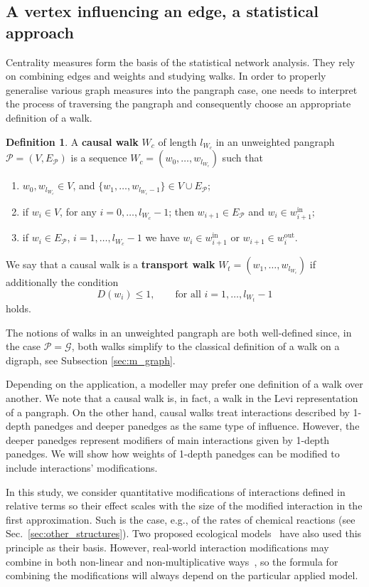 \documentclass[a4paper,12pt]{article}
\theoremstyle{definition}
\newtheorem{definition}{Definition}
\theoremstyle{remark}
\newcommand{\mG}{\mathcal{G}}
\newcommand{\mP}{\mathcal{P}}
\newcommand{\EP}{E_{\mathcal{P}}}
\newcommand{\tin}{\mathrm{in}}
\newcommand{\out}{\mathrm{out}}
\begin{document}
\subsection{A vertex influencing an edge, a statistical approach}\label{sec:v->e}
Centrality measures form the basis of the statistical network analysis. They rely on combining edges and weights and studying walks. In order to properly generalise various graph measures into the pangraph case, one needs to interpret the process of traversing the pangraph and consequently choose an appropriate definition of a walk. 

\begin{definition}\label{def:walk}
    A \textbf{causal walk} $W_c$ of length $l_{W_c}$ in an unweighted pangraph $\mP=(V,\EP)$ is a sequence $W_c=(w_{0},\ldots, w_{l_{W_c}})$ such that
    
\begin{enumerate}
    \item $w_{0},w_{l_{W_c}} \in V$, and $\{w_{1},\ldots, w_{l_{W_c}-1}\} \in V\cup\EP$;
    \item if $w_i\in V$, for any $i=0,\ldots, l_{W_c}-1$; then $w_{i+1}\in \EP$ and $w_i \in w_{i+1}^{\tin};$
    \item if $w_i\in \EP$, $i=1,\ldots, l_{W_c}-1$ we have $w_i \in w_{i+1}^{\tin}$ or $w_{i+1} \in w_{i}^{\out}$.
\end{enumerate}
We say that a causal walk is a \textbf{transport walk} $W_t=(w_1,\ldots, w_{l_{W_c}})$ if additionally the condition
$$D(w_i)\leq 1,\qquad \text{for all}\,\,i=1,\ldots, l_{W_t}-1$$
holds.
\end{definition}

The notions of walks in an unweighted pangraph are both well-defined since, in the case $\mP=\mG$, both walks simplify to the classical definition of a walk on a digraph, see Subsection \ref{sec:m_graph}. 

Depending on the application, a modeller may prefer one definition of a walk over another. We note that a causal walk is, in fact, a walk in the Levi representation of a pangraph. On the other hand, causal walks treat interactions described by 1-depth panedges and deeper panedges as the same type of influence. However, the deeper panedges represent modifiers of main interactions given by 1-depth panedges. We will show how weights of 1-depth panedges can be modified to include interactions' modifications.

In this study, we consider quantitative modifications of interactions defined in relative terms so their effect scales with the size of the modified interaction in the first approximation. Such is the case, e.g., of the rates of chemical reactions (see Sec.~\ref{sec:other_structures}). Two proposed ecological models~\cite{Arditi_2005_non_trophic_rheagogies, Goudard_nontrophic_2008} have also used this principle as their basis. However, real-world interaction modifications may combine in both non-linear and non-multiplicative ways~\cite{Golubski_2011_non_trophic_combining}, so the formula for combining the modifications will always depend on the particular applied model.  
\end{document}
